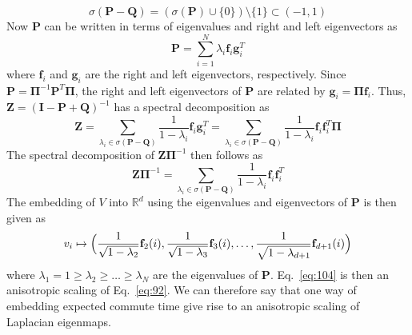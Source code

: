 \begin{equation}
  \label{eq:97}
  \sigma(\mathbf{P} - \mathbf{Q}) = (\sigma(\mathbf{P}) \cup
  \{0\}) \setminus \{1\} \subset (-1,1)
\end{equation}
Now $\mathbf{P}$ can be written in terms of eigenvalues and right and
left eigenvectors as
\begin{equation}
  \label{eq:101}
  \mathbf{P} = \sum_{i=1}^{N}{\lambda_i \mathbf{f}_i \mathbf{g}_i^{T}}
\end{equation}
where $\mathbf{f}_i$ and $\mathbf{g}_i$ are the right and left eigenvectors,
respectively.  Since $\mathbf{P} = \bm{\Pi}^{-1}\mathbf{P}^T\bm{\Pi}$,
the right and left eigenvectors of $\mathbf{P}$ are related by $\mathbf{g}_i =
\bm{\Pi}\mathbf{f}_i$. Thus, $\mathbf{Z} = (\mathbf{I} - \mathbf{P} +
\mathbf{Q})^{-1}$ has a spectral decomposition as
\begin{equation}
  \label{eq:102}
  \mathbf{Z} = \sum_{\lambda_i \in \sigma(\mathbf{P} -
    \mathbf{Q})}{\frac{1}{1 - \lambda_i} \mathbf{f}_i \mathbf{g}_i^{T}} = \sum_{\lambda_i \in \sigma(\mathbf{P} -
    \mathbf{Q})}{\frac{1}{1 - \lambda_i} \mathbf{f}_i \mathbf{f}_i^{T}
    \bm{\Pi}} 
\end{equation}
The spectral decomposition of $\mathbf{Z}\bm{\Pi}^{-1}$ then follows
as
\begin{equation}
  \label{eq:103}
  \mathbf{Z}\bm{\Pi}^{-1} = \sum_{\lambda_i \in \sigma(\mathbf{P} -
    \mathbf{Q})}{\frac{1}{1 - \lambda_i} \mathbf{f}_i \mathbf{f}_i^{T}}
\end{equation}
The embedding of $V$ into $\mathbb{R}^{d}$ using the eigenvalues and
eigenvectors of $\mathbf{P}$ is then given as
\begin{equation}
  \label{eq:104}
  v_i \mapsto \Bigl( \frac{1}{\sqrt{1 - \lambda_2}} \mathbf{f}_2(i),
    \frac{1}{\sqrt{1 - \lambda_3}}\mathbf{f}_3(i), \dots, \frac{1}{\sqrt{1 -
          \lambda_{d+1}}} \mathbf{f}_{d+1}(i) \Bigr)
\end{equation}
where $\lambda_1 = 1 \geq \lambda_2 \geq \dots \geq \lambda_N$ are the
eigenvalues of $\mathbf{P}$. Eq.~\eqref{eq:104} is then an anisotropic
scaling of Eq.~\eqref{eq:92}. We can therefore say that one way of
embedding expected commute time give rise to an anisotropic scaling of
Laplacian eigenmaps.
